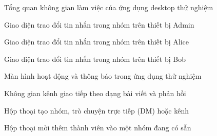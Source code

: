 \documentclass[../DoAn.tex]{subfiles}
\begin{document}
\begin{figure}[htbp]
\centering
{}
\caption{Tổng quan không gian làm việc của ứng dụng desktop thử nghiệm}
\label{fig:appendix_workspace_overview}
\end{figure}

\begin{figure}[htbp]
\centering
{}
\caption{Giao diện trao đổi tin nhắn trong nhóm trên thiết bị Admin}
\label{fig:appendix_chat_admin}
\end{figure}

\begin{figure}[htbp]
\centering
{}
\caption{Giao diện trao đổi tin nhắn trong nhóm trên thiết bị Alice}
\label{fig:appendix_chat_alice}
\end{figure}

\begin{figure}[htbp]
\centering
{}
\caption{Giao diện trao đổi tin nhắn trong nhóm trên thiết bị Bob}
\label{fig:appendix_chat_bob}
\end{figure}

\begin{figure}[htbp]
\centering
{}
\caption{Màn hình hoạt động và thông báo trong ứng dụng thử nghiệm}
\label{fig:appendix_activity}
\end{figure}

\begin{figure}[htbp]
\centering
{}
\caption{Không gian kênh giao tiếp theo dạng bài viết và phản hồi}
\label{fig:appendix_channel}
\end{figure}

\begin{figure}[htbp]
\centering
{}
\caption{Hộp thoại tạo nhóm, trò chuyện trực tiếp (DM) hoặc kênh}
\label{fig:appendix_create_group}
\end{figure}

\begin{figure}[htbp]
\centering
{}
\caption{Hộp thoại mời thêm thành viên vào một nhóm đang có sẵn}
\label{fig:appendix_add_member}
\end{figure}
\end{document}
